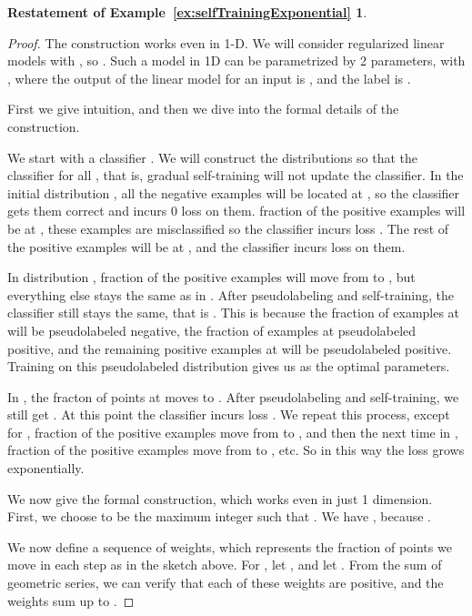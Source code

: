 \documentclass[11pt]{article}
\begin{document}
\newtheorem*{selfTrainingExponentialExample}{Restatement of Example~\ref{ex:selfTrainingExponential}}

\begin{selfTrainingExponentialExample}
\selfTrainingExponentialText{}
\end{selfTrainingExponentialExample}

\begin{proof}
The construction works even in 1-D. We will consider regularized linear models  with , so . Such a model in 1D can be parametrized by 2 parameters,  with , where the output of the linear model for an input  is , and the label is .

First we give intuition, and then we dive into the formal details of the construction.

We start with a classifier .
We will construct the distributions so that the classifier  for all , that is, gradual self-training will not update the classifier.
In the initial distribution , all the negative examples will be located at , so the classifier gets them correct and incurs 0 loss on them.
 fraction of the positive examples will be at , these examples are misclassified so the classifier incurs loss .
The rest of the positive examples will be at , and the classifier incurs  loss on them.

In distribution ,  fraction of the positive examples will move from  to , but everything else stays the same as in .
After pseudolabeling and self-training, the classifier still stays the same, that is .
This is because the  fraction of examples at  will be pseudolabeled negative, the  fraction of examples at  pseudolabeled positive, and the remaining positive examples at  will be pseudolabeled positive. 
Training on this pseudolabeled distribution gives us  as the optimal parameters.

In , the  fracton of points at  moves to .
After pseudolabeling and self-training, we still get .
At this point the classifier incurs loss .
We repeat this process, except for ,  fraction of the positive examples move from  to , and then the next time in ,  fraction of the positive examples move from  to , etc.
So in this way the loss grows exponentially.

We now give the formal construction, which works even in just 1 dimension.
First, we choose  to be the maximum integer such that .
We have , because .

We now define a sequence of weights, which represents the fraction of points we move in each step as in the sketch above.
For , let , and let .
From the sum of geometric series, we can verify that each of these weights are positive, and the weights sum up to .


\end{proof}
\end{document}
